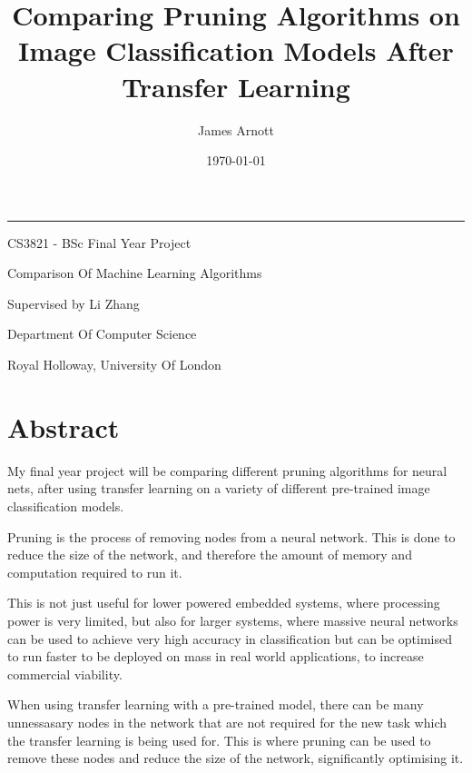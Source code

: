 \documentclass{article}
\title{\titleFont Comparing Pruning Algorithms on Image Classification Models After Transfer Learning}
\date{\Large \today}
\author{\subtitleFont James Arnott}
\begin{document}
\maketitle

\begin {center}
\noindent\rule{15cm}{0.4pt}
\end{center}

\vspace{1cm}

\begin{center}
	\begin{Large}
			CS3821 - BSc Final Year Project
			
			Comparison Of Machine Learning Algorithms

			Supervised by Li Zhang

			\vspace{0.6cm}

			Department Of Computer Science

			\vspace{0.2cm}

			Royal Holloway, University Of London
	\end{Large}
\end{center}


\pagebreak

\section{Abstract}
My final year project will be comparing different pruning algorithms for neural nets,
after using transfer learning on a variety of different pre-trained image classification models.

Pruning is the process of removing nodes from a neural network.
This is done to reduce the size of the network, and therefore the amount of memory and
computation required to run it.

This is not just useful for lower powered embedded systems,
where processing power is very limited, but also for larger systems,
where massive neural networks can be used to achieve very
high accuracy in classification but can be optimised to run faster
to be deployed on mass in real world applications, to increase
commercial viability.

When using transfer learning with a pre-trained model, there can be many
unnessasary nodes in the network that are not required for the new task
which the transfer learning is being used for. This is where pruning can be used
to remove these nodes and reduce the size of the network, significantly optimising it.
\end{document}
